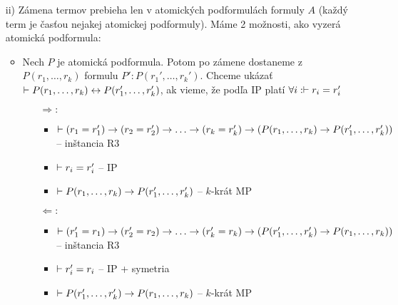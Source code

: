 \begin{dokaz}
\begin{itemize}
\begin{itemize}
        \end{itemize}
    \item[ii)] Zámena termov prebieha len v atomických podformulách
        formuly $A$ (každý term je časťou nejakej atomickej podformuly).
        Máme 2 možnosti, ako vyzerá atomická podformula:
        \begin{itemize}
        \item Nech $P$ je atomická podformula. Potom po zámene dostaneme z 
            $P(r_1, \dots, r_k)$ formulu $P':P(r_1',\dots,r_k')$.
            Chceme ukázať $\vdash P(r_1,\dots,r_k) \leftrightarrow
                                     P(r_1',\dots,r_k')$, ak vieme, že
            podľa IP platí $\forall i: \vdash r_i = r_i'$
            \begin{itemize}
            \item [$\Rightarrow:$] 
                \begin{itemize}
                \item $\provable (r_1=r_1') \implies
                                 (r_2=r_2') \implies \dots \implies
                                 (r_k=r_k') \implies
                                 (P(r_1,\dots,r_k) \implies
                                 P(r_1',\dots,r_k'))$ -- inštancia R3
                \item $\vdash r_i = r_i'$ -- IP
                \item $\vdash P(r_1,\dots,r_k) \rightarrow
                    P(r_1',\dots, r_k')$ -- $k$-krát MP
                \end{itemize}
            \item [$\Leftarrow:$]
                \begin{itemize}
                \item $\provable (r_1'=r_1) \implies
                                 (r_2'=r_2) \implies \dots \implies
                                 (r_k'=r_k) \implies
                                 (P(r_1',\dots,r_k') \implies
                                 P(r_1,\dots,r_k))$ -- inštancia R3
                \item $\vdash r_i' = r_i$ -- IP + symetria
                \item $\vdash P(r_1',\dots,r_k') \rightarrow
                    P(r_1,\dots, r_k)$ -- $k$-krát MP
                

\end{itemize}
\end{itemize}
\end{itemize}
\end{itemize}
\end{dokaz}
